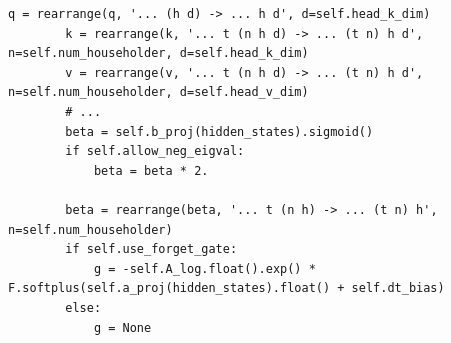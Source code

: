 \begin{lstlisting}[caption={Excerpt from \texttt{repos/\allowbreak{}fla-org\_\_flash-linear-attention/\allowbreak{}fla/\allowbreak{}layers/\allowbreak{}gated\_deltaproduct.py}},label={lst:c06-dp-fla}]
        q = rearrange(q, '... (h d) -> ... h d', d=self.head_k_dim)
        k = rearrange(k, '... t (n h d) -> ... (t n) h d', n=self.num_householder, d=self.head_k_dim)
        v = rearrange(v, '... t (n h d) -> ... (t n) h d', n=self.num_householder, d=self.head_v_dim)
        # ...
        beta = self.b_proj(hidden_states).sigmoid()
        if self.allow_neg_eigval:
            beta = beta * 2.

        beta = rearrange(beta, '... t (n h) -> ... (t n) h', n=self.num_householder)
        if self.use_forget_gate:
            g = -self.A_log.float().exp() * F.softplus(self.a_proj(hidden_states).float() + self.dt_bias)
        else:
            g = None
\end{lstlisting}

